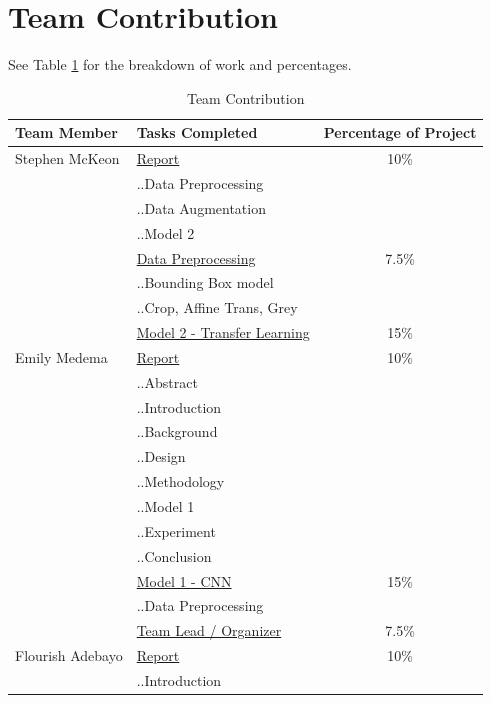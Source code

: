 \documentclass[paper=a4, fontsize=11pt]{scrartcl}
\numberwithin{equation}{section}		%
\numberwithin{table}{section}				%
\begin{document}
\section{Team Contribution}\label{sec: teamcontribution}
See Table \ref{tab:contributionTable} for the breakdown of work and percentages.
\begin{table}[h!]
  \begin{center}
    \caption{Team Contribution}
    \label{tab:contributionTable}
    \begin{tabular}{l|l|c}
      \textbf{Team Member} & \textbf{Tasks Completed} & \textbf{Percentage of Project}\\
      \hline
      Stephen McKeon & \underline{Report}&  10\%\\
                     & ..Data Preprocessing &\\
                     & ..Data Augmentation &\\
                     & ..Model 2 &\\
                     & \underline{Data Preprocessing}& 7.5\%\\
                     & ..Bounding Box model&\\
                     & ..Crop, Affine Trans, Grey &\\
                     & \underline{Model 2 - Transfer Learning}& 15\%\\
      Emily Medema   & \underline{Report}& 10\%\\
                     & ..Abstract&\\
                     & ..Introduction&\\
                     & ..Background&\\
                     & ..Design&\\
                     & ..Methodology&\\
                     & ..Model 1&\\
                     & ..Experiment &\\
                     & ..Conclusion &\\
                     & \underline{Model 1 - CNN}& 15\%\\
                     & ..Data Preprocessing&\\
                     & \underline{Team Lead / Organizer}& 7.5\%\\
      Flourish Adebayo & \underline{Report}& 10\%\\
                     & ..Introduction&\\

\end{tabular}
\end{center}
\end{table}
\end{document}
